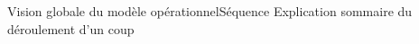 \begin{frame}{Vision globale du modèle opérationnel}{Séquence}
Explication sommaire du déroulement d'un coup
\end{frame}